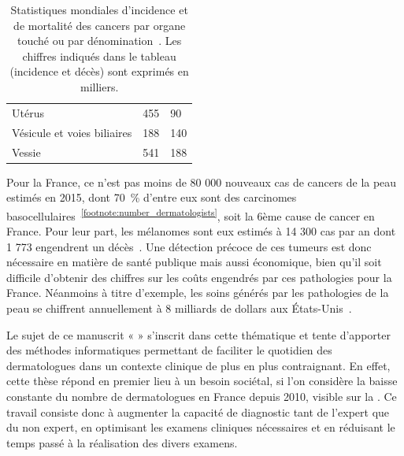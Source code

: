\begin{table}[H]
\begin{tabular}{lll}
        Utérus                                  & 455                           & 90                        \\
        Vésicule et voies biliaires             & 188                           & 140                       \\
        Vessie                                  & 541                           & 188                       \\ \bottomrule
    \end{tabular}
    \caption{Statistiques mondiales d’incidence et de mortalité des cancers par organe touché ou par dénomination~\cite{Karimkhani2017}. Les chiffres indiqués dans le tableau (incidence et décès) sont exprimés en milliers.}
    \label{tab:introduction_cancer_incidence}
\end{table}

Pour la France, ce n’est pas moins de 80 000 nouveaux cas de cancers de la peau estimés en 2015, dont 70~\% d'entre eux sont des carcinomes basocellulaires~\textsuperscript{\ref{footnote:number_dermatologists}}, soit la 6ème cause de cancer en France. Pour leur part, les mélanomes sont eux estimés à 14 300 cas par an dont 1 773 engendrent un décès~\cite{Thuret2012}. Une détection précoce de ces tumeurs est donc nécessaire en matière de santé publique mais aussi économique, bien qu'il soit difficile d'obtenir des chiffres sur les coûts engendrés par ces pathologies pour la France. Néanmoins à titre d'exemple, les soins générés par les pathologies de la peau se chiffrent annuellement à 8 milliards de dollars aux États-Unis~\cite{Farberg2017a}.\par

\addtocounter{footnote}{1}

Le sujet de ce manuscrit « \titleref » s’inscrit dans cette thématique et tente d’apporter des méthodes informatiques permettant de faciliter le quotidien des dermatologues dans un contexte clinique de plus en plus contraignant. En effet, cette thèse répond en premier lieu à un besoin sociétal, si l'on considère la baisse constante du nombre de dermatologues en France depuis 2010, visible sur la . Ce travail consiste donc à augmenter la capacité de diagnostic tant de l'expert que du non expert, en optimisant les examens cliniques nécessaires et en réduisant le temps passé à la réalisation des divers examens.\par

